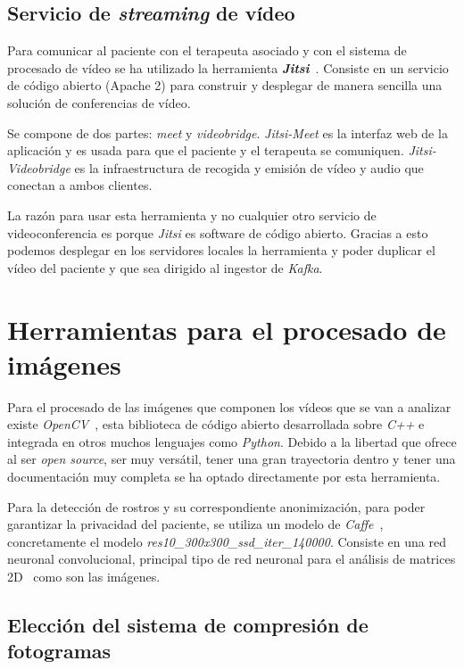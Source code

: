 \subsection{Servicio de \textit{streaming} de vídeo}

Para comunicar al paciente con el terapeuta asociado y con el sistema de procesado de vídeo se ha utilizado la herramienta \textit{\textbf{Jitsi}}~\cite{tool:jitsi}. Consiste en un servicio de código abierto (Apache 2) para construir y desplegar de manera sencilla una solución de conferencias de vídeo.

Se compone de dos partes: \textit{meet} y \textit{videobridge}. \textit{Jitsi-Meet} es la interfaz web de la aplicación y es usada para que el paciente y el terapeuta se comuniquen. \textit{Jitsi-Videobridge} es la infraestructura de recogida y emisión de vídeo y audio que conectan a ambos clientes.

La razón para usar esta herramienta y no cualquier otro servicio de videoconferencia es porque \textit{Jitsi} es software de código abierto. Gracias a esto podemos desplegar en los servidores locales la herramienta y poder duplicar el vídeo del paciente y que sea dirigido al ingestor de \textit{Kafka}.

\section{Herramientas para el procesado de imágenes}

Para el procesado de las imágenes que componen los vídeos que se van a analizar existe \textit{OpenCV}~\cite{opencv_library}, esta biblioteca de código abierto desarrollada sobre \textit{C++} e integrada en otros muchos lenguajes como \textit{Python}. Debido a la libertad que ofrece al ser \textit{open source}, ser muy versátil, tener una gran trayectoria dentro  y tener una documentación muy completa se ha optado directamente por esta herramienta.

Para la detección de rostros y su correspondiente anonimización, para poder garantizar la privacidad del paciente, se utiliza un modelo de \textit{Caffe}~\cite{jia2014caffe}, concretamente el modelo \textit{res10\_300x300\_ssd\_iter\_140000}. Consiste en una red neuronal convolucional, principal tipo de red neuronal para el análisis de matrices 2D~\cite{lawrence1997face} como son las imágenes.


\subsection{Elección del sistema de compresión de fotogramas}\label{sec:sistemacompresion}

